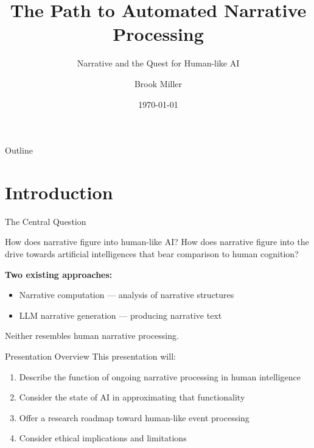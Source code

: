 \documentclass[aspectratio=169]{beamer}
\title{The Path to Automated Narrative Processing}
\subtitle{Narrative and the Quest for Human-like AI}
\author{Brook Miller}
\institute{Center for Humanities and Digital Research, University of Central Florida}
\date{\today}
\begin{document}
\begin{frame}
  \titlepage
\end{frame}

\begin{frame}{Outline}
  \tableofcontents
\end{frame}

\section{Introduction}

\begin{frame}{The Central Question}
  \begin{block}{How does narrative figure into human-like AI?}
    How does narrative figure into the drive towards artificial intelligences that bear comparison to human cognition?
  \end{block}
  
  \pause
  \vspace{1em}
  
  \textbf{Two existing approaches:}
  \begin{itemize}
    \item Narrative computation — analysis of narrative structures
    \item LLM narrative generation — producing narrative text
  \end{itemize}
  
  \pause
  \vspace{1em}
  
  \alert{Neither resembles human narrative processing.}
\end{frame}

\begin{frame}{Presentation Overview}
  This presentation will:
  \begin{enumerate}
    \item Describe the function of ongoing narrative processing in human intelligence
    \item Consider the state of AI in approximating that functionality
    \item Offer a research roadmap toward human-like event processing
    \item Consider ethical implications and limitations
  \end{enumerate}
\end{frame}
\end{document}
